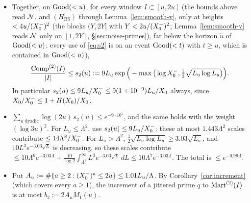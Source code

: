 \begin{itemize}
\item Together, on $\mathrm{Good}(<u)$, for every window $I\subset[u,2u]$ (the bounds above read $\mathcal{N}$, and $(H_{\mathrm{BS}})$ through
  Lemma~\ref{lem:smooth-v}, only at heights $<4u/(X_0^{-})^2$ (the blocks $(Y,2Y]$ with $Y<2u/(X_0^{-})^2$; Lemma~\ref{lem:smooth-v} reads $\mathcal{N}$ only on
  $[1,2Y]$, \S\ref{sec:noise-primes}), far below the horizon $\check u$ of $\mathrm{Good}(<u)$; every use of
  \eqref{eq:s2} is on an event $\mathrm{Good}(<t)$ with $t\ge u$, which is contained in $\mathrm{Good}(<u)$),
  \begin{equation}\label{eq:s2}
    \frac{\mathrm{Comp}^{(2)}(I)}{|I|}\le s_2(u):=9L_u\exp\Big(-\max\big(\log X_0^{-},\tfrac12\sqrt{L_u\log L_u}\big)\Big).
  \end{equation}
  In particular $s_2(u)\le9L_u/X_0^{-}\le9(1+10^{-9})L_u/X_0$ always, since $X_0/X_0^{-}\le1+H(X_0)/X_0$.
\item $\sum_{u\text{ dyadic}}\log(2u)\,s_2(u)\le e^{-9\cdot10^7}$, and the same holds with the weight $(\log3u)^2$. For
  $L_u\le\Lambda^2$, use $s_2(u)\le9L_u/X_0^{-}$: these at most $1.443\Lambda^2$ scales contribute $\le14\Lambda^8/X_0^{-}$. For
  $L_u>\Lambda^2$, $\frac12\sqrt{L_u\log L_u}\ge3.03\sqrt{L_u}$, and $10L^3e^{-3.03\sqrt L}$ is decreasing, so these scales
  contribute $\le10\Lambda^6e^{-3.03\Lambda}+\frac{10}{\log2}\int_{\Lambda^2}^\infty L^3e^{-3.03\sqrt L}\,dL\le10\Lambda^7e^{-3.03\Lambda}$.
  The total is $\le e^{-0.99\Lambda}$.
\item Put $A_u:=\#\{a\ge2:(X_0^{-})^a\le2u\}\le1.01L_u/\Lambda$. By Corollary~\ref{cor:increment} (which covers every
  $a\ge1$), the increment of a jittered prime $q$ to $\mathrm{Mart}^{(2)}(I)$ is at most $b_2:=2A_uM_1(u)$.
\end{itemize}


